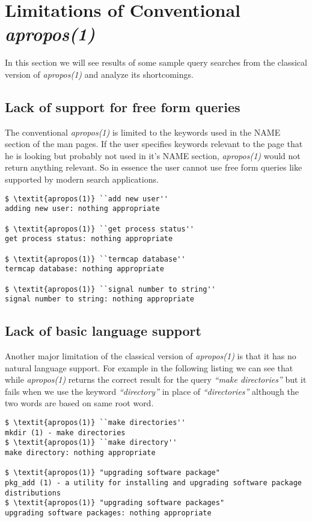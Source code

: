 \documentclass[titlepage, a4paper, 12pt]{article}
\begin{document}
\section{Limitations of Conventional \textit{apropos(1)}}
In this section we will see results of some sample query searches from
the classical version of \textit{apropos(1)} and analyze its shortcomings.

\subsection{Lack of support for free form queries}
The conventional \textit{apropos(1)} is limited to the keywords used in the NAME section
of the man pages. If the user specifies keywords relevant to the page that he
is looking but probably not used in it's NAME section, \textit{apropos(1)} would not return
anything relevant. So in essence the user cannot use free form queries like
supported by modern search applications.
\begin{lstlisting}
$ \textit{apropos(1)} ``add new user''
adding new user: nothing appropriate

$ \textit{apropos(1)} ``get process status''
get process status: nothing appropriate

$ \textit{apropos(1)} ``termcap database''
termcap database: nothing appropriate

$ \textit{apropos(1)} ``signal number to string''
signal number to string: nothing appropriate
\end{lstlisting}

\subsection{Lack of basic language support}
Another major limitation of the classical version of \textit{apropos(1)} is that
it has no
natural language support. For example in the following listing we can see that
while \textit{apropos(1)} returns the correct result for the query \textit{``make directories''} but it fails when we use the keyword \textit{``directory''}
in place of \textit{``directories''} although the two words are based on same
root word.
\begin{lstlisting}
$ \textit{apropos(1)} ``make directories''
mkdir (1) - make directories
$ \textit{apropos(1)} ``make directory''
make directory: nothing appropriate

$ \textit{apropos(1)} "upgrading software package"
pkg_add (1) - a utility for installing and upgrading software package
distributions
$ \textit{apropos(1)} "upgrading software packages"
upgrading software packages: nothing appropriate
\end{lstlisting}
\end{document}
